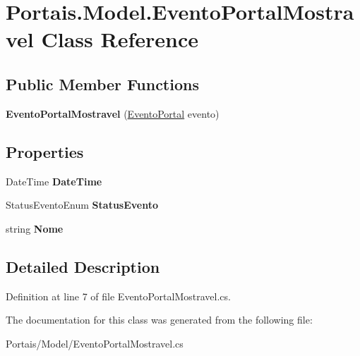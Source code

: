 \hypertarget{class_portais_1_1_model_1_1_evento_portal_mostravel}{}\section{Portais.\+Model.\+Evento\+Portal\+Mostravel Class Reference}
\label{class_portais_1_1_model_1_1_evento_portal_mostravel}
\subsection*{Public Member Functions}
\begin{DoxyCompactItemize}
\item 
{\bfseries Evento\+Portal\+Mostravel} (\hyperlink{class_cruzeiro_1_1_core_1_1_model_1_1_evento_portal}{Evento\+Portal} evento)\hypertarget{class_portais_1_1_model_1_1_evento_portal_mostravel_a44ddfc0dbf1b6757290a38738584f6f4}{}\label{class_portais_1_1_model_1_1_evento_portal_mostravel_a44ddfc0dbf1b6757290a38738584f6f4}

\end{DoxyCompactItemize}
\subsection*{Properties}
\begin{DoxyCompactItemize}
\item 
Date\+Time {\bfseries Date\+Time}\hypertarget{class_portais_1_1_model_1_1_evento_portal_mostravel_af6edb687b6d147469a902d3f9a3fa40a}{}\label{class_portais_1_1_model_1_1_evento_portal_mostravel_af6edb687b6d147469a902d3f9a3fa40a}

\item 
Status\+Evento\+Enum {\bfseries Status\+Evento}\hypertarget{class_portais_1_1_model_1_1_evento_portal_mostravel_a9120a840e95199a5588a9c9ac6bc3604}{}\label{class_portais_1_1_model_1_1_evento_portal_mostravel_a9120a840e95199a5588a9c9ac6bc3604}

\item 
string {\bfseries Nome}\hypertarget{class_portais_1_1_model_1_1_evento_portal_mostravel_af842df26f14467249c9081af68548642}{}\label{class_portais_1_1_model_1_1_evento_portal_mostravel_af842df26f14467249c9081af68548642}

\end{DoxyCompactItemize}


\subsection{Detailed Description}


Definition at line 7 of file Evento\+Portal\+Mostravel.\+cs.



The documentation for this class was generated from the following file\+:\begin{DoxyCompactItemize}
\item 
Portais/\+Model/Evento\+Portal\+Mostravel.\+cs\end{DoxyCompactItemize}
